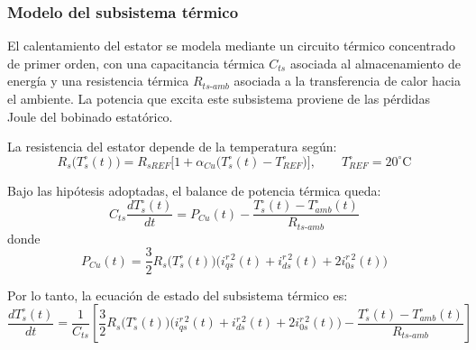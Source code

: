 \documentclass[12pt, a4paper,journal, onecolumn, compsoc]{IEEEtran}
\begin{document}
    \subsubsection{Modelo del subsistema térmico}
    El calentamiento del estator se modela mediante un circuito térmico concentrado de primer orden, con una capacitancia térmica \(C_{ts}\) asociada al almacenamiento de energía y una resistencia térmica \(R_{ts\text{-}amb}\) asociada a la transferencia de calor hacia el ambiente. La potencia que excita este subsistema proviene de las pérdidas Joule del bobinado estatórico.

    La resistencia del estator depende de la temperatura según:
    \begin{equation}
        R_s\big(T_s^\circ(t)\big)=R_{sREF}\Big[1+\alpha_{Cu}\big(T_s^\circ(t)-T_{REF}^\circ\big)\Big], \qquad T_{REF}^\circ=20^\circ\text{C}
    \end{equation}

    Bajo las hipótesis adoptadas, el balance de potencia térmica queda:
    \begin{equation}
        C_{ts}\frac{dT_s^\circ(t)}{dt}=P_{Cu}(t)-\frac{T_s^\circ(t)-T_{amb}^\circ(t)}{R_{ts\text{-}amb}}
    \end{equation}
    donde
    \begin{equation}
        P_{Cu}(t)=\frac{3}{2}R_s\big(T_s^\circ(t)\big)\Big(i_{qs}^{r\,2}(t)+i_{ds}^{r\,2}(t)+2i_{0s}^{r\,2}(t)\Big)
    \end{equation}

    Por lo tanto, la ecuación de estado del subsistema térmico es:
    \begin{equation}
        \frac{dT_s^\circ(t)}{dt}=\frac{1}{C_{ts}}\left[\frac{3}{2}R_s\big(T_s^\circ(t)\big)\Big(i_{qs}^{r\,2}(t)+i_{ds}^{r\,2}(t)+2i_{0s}^{r\,2}(t)\Big)-\frac{T_s^\circ(t)-T_{amb}^\circ(t)}{R_{ts\text{-}amb}}\right]
    \end{equation}
\end{document}
